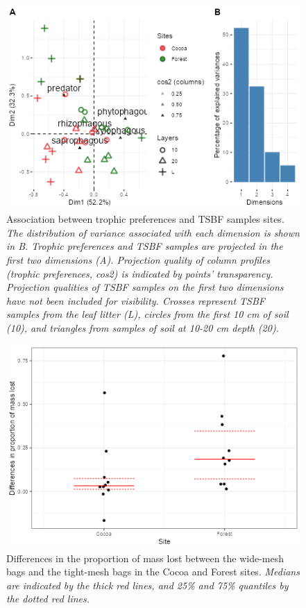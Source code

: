 \documentclass[fleqn,10pt]{ArtEcoFoG} %
\begin{document}
\scriptsize

\begin{figure}

{\centering \includegraphics[width=0.8\linewidth,]{rapport_files/figure-latex/trophic-1} 

}

\caption{Association between trophic preferences and TSBF samples sites. \textit{The distribution of variance associated with each dimension is shown in B. Trophic preferences and TSBF samples are projected in the first two dimensions (A). Projection quality of column profiles (trophic preferences, cos2) is indicated by points’ transparency. Projection qualities of TSBF samples on the first two dimensions have not been included for visibility. Crosses represent TSBF samples from the leaf litter (L), circles from the first 10 cm of soil (10), and triangles from samples of soil at 10-20 cm depth (20).}}\label{fig:trophic}
\end{figure}

\normalsize

\scriptsize

\begin{figure}

{\centering \includegraphics[width=0.8\linewidth]{rapport_files/figure-latex/wood-1} 

}

\caption{Differences in the proportion of mass lost between the wide-mesh bags and the tight-mesh bags in the Cocoa and Forest sites. \textit{Medians are indicated by the thick red lines, and 25\% and 75\% quantiles by the dotted red lines.}}\label{fig:wood}
\end{figure}
\end{document}
